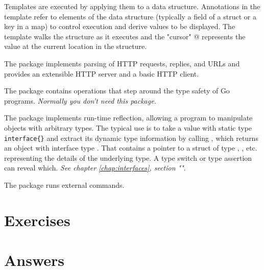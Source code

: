 \begin{description}
{Templates are executed by applying them to a data structure.  Annotations in
the template refer to elements of the data structure (typically a field of a
struct or a key in a map) to control execution and derive values to be
displayed.  The template walks the structure as it executes and the "cursor" @
represents the value at the current location in the structure.
}
\item[\package{http}]{
The  package implements parsing of HTTP requests, replies,
and URLs and provides an extensible HTTP server and a basic
HTTP client.
}
\item[\package{unsafe}]{
The  package contains operations that step around the type safety of Go programs.
\emph{Normally you don't need this package.}
}
\item[\package{reflect}]{
The  package implements run-time reflection, allowing a program to
manipulate objects with arbitrary types.  The typical use is to take a
value with static type \lstinline|interface{}| and extract its dynamic type
information by calling , which returns an object with interface
type .  That contains a pointer to a struct of type ,
, etc. representing the details of the underlying type.  A type
switch or type assertion can reveal which. \emph{See chapter \ref{chap:interfaces}, 
section ""}.
}
\item[\package{exec}]{
The  package runs external commands.
}
\end{description}

\section{Exercises}




\cleardoublepage
\section{Answers}
\shipoutAnswer
